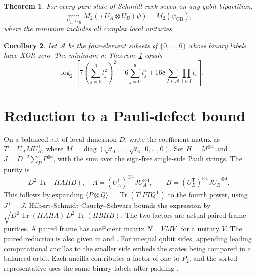 \documentclass[11pt]{article}
\newtheorem{theorem}{Theorem}
\newtheorem{corollary}[theorem]{Corollary}
\newcommand{\tr}{\operatorname{Tr}}
\newcommand{\CB}{\mathrm{CB}}
\begin{document}
\begin{theorem}\label{thm:rank7}
For every pure state of Schmidt rank seven on any qubit bipartition,
\[
 \min_{U_A,U_B} M_2((U_A\otimes U_B)\psi)=M_2(\psi_{\CB}),
\]
where the minimum includes all complex local unitaries.
\end{theorem}

\begin{corollary}\label{cor:formula}
Let \(\mathcal A\) be the four-element subsets of
\(\{0,\ldots,6\}\) whose binary labels have XOR zero. The minimum in
Theorem~\ref{thm:rank7} equals
\[
 -\log_2\!\left[
 7\left(\sum_{j=0}^{6}t_j^2\right)^2
 -6\sum_{j=0}^{6}t_j^4
 +168\sum_{I\in\mathcal A}\prod_{i\in I}t_i
 \right].
\]
\end{corollary}

\section{Reduction to a Pauli-defect bound}

On a balanced cut of local dimension \(D\), write the coefficient
matrix as \(T=U_A M U_B^{\mathsf T}\), where
\(M=\operatorname{diag}(\sqrt{t_0},\ldots,\sqrt{t_6},0,\ldots,0)\).
Set \(H=M^{\otimes4}\) and \(J=D^{-2}\sum_P P^{\otimes4}\), with
the sum over the sign-free single-side Pauli strings. The purity is
\[
 D^2\tr(HAHB),\quad
 A=(U_A^\dagger)^{\otimes4} J U_A^{\otimes4},\qquad
 B=(U_B^{\mathsf T})^{\otimes4} J \overline{U_B}^{\otimes4}.
\]
This follows by expanding
\(\langle P\otimes Q\rangle=\tr(T^\dagger P T Q^{\mathsf T})\)
to the fourth power, using \(J^{\mathsf T}=J\).
Hilbert--Schmidt Cauchy--Schwarz bounds the expression by
\(\sqrt{D^2\tr(HAHA)\,D^2\tr(HBHB)}\).
The two factors are actual paired-frame purities. A paired frame has
coefficient matrix \(N=VMV^\dagger\) for a unitary \(V\).
The paired reduction is also given in
\cite[Lemma 1 and Corollary 1]{sierant} and
\cite[Eq.~(4) and Appendix B]{lcnew}.
For unequal qubit sides, appending leading computational ancillas to
the smaller side embeds the states being compared in a balanced
orbit. Each ancilla contributes a factor of one to \(P_2\), and the
sorted representative uses the same binary labels after padding
\cite[Eq.~(16)]{sierant}.
\end{document}
